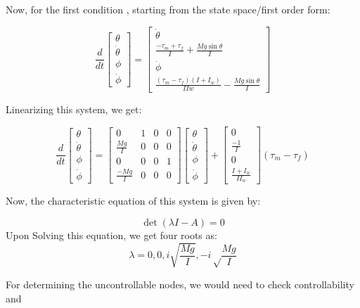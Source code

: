 \documentclass{article}
\begin{document}
Now, for the first condition , starting from the state space/first order form:
\begin{center}
  \[
\frac{d}{dt}
\begin{bmatrix}
\theta \\
\dot{\theta} \\
\phi \\
\dot{\phi} 
\end{bmatrix}
=
\begin{bmatrix}
\dot{\theta} \\
\frac{-\tau_m + \tau_f}{I} + \frac{Mg\sin\theta}{I} \\
\dot{\phi} \\
\frac{(\tau_m - \tau_f)(I + I_w)}{IIw} - \frac{Mg \sin\theta}{I}
\end{bmatrix}
\]
\end{center}
Linearizing this system, we get:
\begin{center}  
  \[
\frac{d}{dt}
\begin{bmatrix}
\theta \\
\dot{\theta} \\
\phi \\
\dot{\phi} 
\end{bmatrix} = 
\begin{bmatrix}
0 & 1 & 0 & 0 \\
\frac{Mg}{I} & 0 & 0 & 0 \\
0 & 0 & 0 & 1 \\
\frac{-Mg}{I} & 0 & 0 & 0
\end{bmatrix}
\begin{bmatrix}
\theta \\
\dot{\theta} \\
\phi \\
\dot{\phi}
\end{bmatrix}
+
\begin{bmatrix}
0 \\
\frac{-1}{I} \\
0 \\
\frac{I + I_w}{II_w}
\end{bmatrix}
(\tau_m - \tau_f)
\]
\end{center}
Now, the characteristic equation of this system is given by:
\begin{center}
\[
\det(\lambda I - A) = 0
\]
Upon Solving this equation, we get four roots as:
\[
\lambda = 0, 0, i \sqrt{\frac{Mg}{I}}, -i \sqrt\frac{Mg}{I} 
\]
\end{center}
For determining the uncontrollable nodes, we would need to check controllability and 
\end{document}
